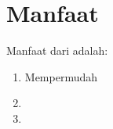 \section{Manfaat}
\label{sec:manfaat}

Manfaat dari \lipsum[1][1-3] adalah:

\begin{enumerate}[nolistsep]

  \item Mempermudah \lipsum[2][1-3]

  \item \lipsum[3][1-5]

  \item \lipsum[4][1-5]

\end{enumerate}



















